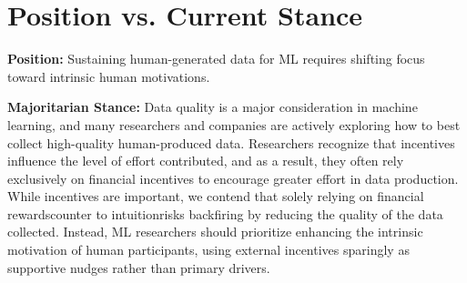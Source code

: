 \section{Position vs. Current Stance}
\noindent\textbf{Position:} Sustaining human-generated data for ML requires shifting focus toward intrinsic human motivations.

\noindent\textbf{Majoritarian Stance:} Data quality is a major consideration in machine learning, and many researchers and companies are actively exploring how to best collect high-quality human-produced data. Researchers recognize that incentives influence the level of effort contributed, and as a result, they often rely exclusively on financial incentives to encourage greater effort in data production. While incentives are important, we contend that solely relying on financial rewards\textemdash{}counter to intuition\textemdash{}risks backfiring by reducing the quality of the data collected. Instead, ML researchers should prioritize enhancing the intrinsic motivation of human participants, using external incentives sparingly as supportive nudges rather than primary drivers.